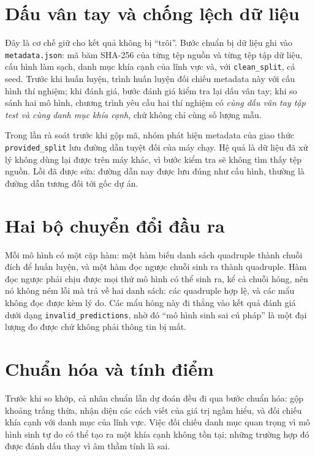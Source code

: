 \documentclass[12pt,a4paper]{report}
\newcommand{\enquote}[1]{“#1”}
\newcommand{\code}[1]{\texttt{#1}}
\begin{document}
\section{Dấu vân tay và chống lệch dữ liệu}

Đây là cơ chế giữ cho kết quả không bị \enquote{trôi}. Bước chuẩn bị dữ liệu ghi vào \code{metadata.json}: mã băm
SHA-256 của từng tệp nguồn và từng tệp tập dữ liệu, cấu hình làm sạch, danh mục khía cạnh của lĩnh vực và, với
\code{clean\_split}, cả seed. Trước khi huấn luyện, trình huấn luyện đối chiếu metadata này với cấu hình thí nghiệm; khi
đánh giá, bước đánh giá kiểm tra lại dấu vân tay; khi so sánh hai mô hình, chương trình yêu cầu hai thí nghiệm có
\emph{cùng dấu vân tay tập test và cùng danh mục khía cạnh}, chứ không chỉ cùng số lượng mẫu.

Trong lần rà soát trước khi gộp mã, nhóm phát hiện metadata của giao thức \code{provided\_split} lưu đường dẫn tuyệt đối
của máy chạy. Hệ quả là dữ liệu đã xử lý không dùng lại được trên máy khác, vì bước kiểm tra sẽ không tìm thấy tệp
nguồn. Lỗi đã được sửa: đường dẫn nay được lưu đúng như cấu hình, thường là đường dẫn tương đối tới gốc dự án.

\section{Hai bộ chuyển đổi đầu ra}

Mỗi mô hình có một cặp hàm: một hàm biến danh sách quadruple thành chuỗi đích để huấn luyện, và một hàm đọc ngược chuỗi
sinh ra thành quadruple. Hàm đọc ngược phải chịu được mọi thứ mô hình có thể sinh ra, kể cả chuỗi hỏng, nên nó không
ném lỗi mà trả về hai danh sách: các quadruple hợp lệ, và các mẩu không đọc được kèm lý do. Các mẩu hỏng này đi thẳng
vào kết quả đánh giá dưới dạng \code{invalid\_predictions}, nhờ đó \enquote{mô hình sinh sai cú pháp} là một đại lượng
đo được chứ không phải thông tin bị mất.

\section{Chuẩn hóa và tính điểm}

Trước khi so khớp, cả nhãn chuẩn lẫn dự đoán đều đi qua bước chuẩn hóa: gộp khoảng trắng thừa, nhận diện các cách viết
của giá trị ngầm hiểu, và đối chiếu khía cạnh với danh mục của lĩnh vực. Việc đối chiếu danh mục quan trọng vì mô hình
sinh tự do có thể tạo ra một khía cạnh không tồn tại; những trường hợp đó được đánh dấu thay vì âm thầm tính là sai.
\end{document}
